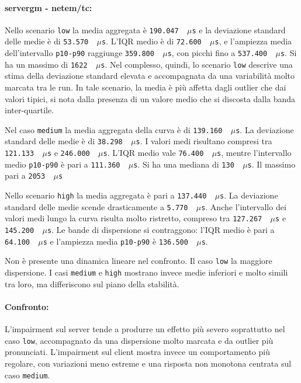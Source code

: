 \paragraph*{servergm - netem/tc:}
Nello scenario \texttt{low} la media aggregata è \texttt{190.047 \,$\mu$s} e la deviazione
standard delle medie è di \texttt{53.570 \,$\mu$s}. L'IQR medio è di \texttt{72.600
\,$\mu$s}, e l'ampiezza media dell'intervallo \texttt{p10-p90} raggiunge \texttt{359.800
\,$\mu$s}, con picchi fino a \texttt{537.400 \,$\mu$s}. Si ha un massimo di
\texttt{1622 \,$\mu$s}. Nel complesso, quindi, lo scenario \texttt{low} descrive una
stima della deviazione standard elevata e accompagnata da una variabilità molto marcata
tra le run. In tale scenario, la media è più affetta dagli outlier che dai valori tipici, 
si nota dalla presenza di un valore medio che si discosta dalla banda inter-quartile.

Nel caso \texttt{medium} la media aggregata della curva è di \texttt{139.160 \,$\mu$s}.
La deviazione standard delle medie è di \texttt{38.298 \,$\mu$s}. I valori medi
risultano compresi tra \texttt{121.133 \,$\mu$s} e \texttt{246.000 \,$\mu$s}. L'IQR
medio vale \texttt{76.400 \,$\mu$s}, mentre l'intervallo medio \texttt{p10-p90}
è pari a \texttt{111.360 \,$\mu$s}. Si ha una mediana di \texttt{130 \,$\mu$s}.
Il massimo pari a \texttt{2053 \,$\mu$s}

Nello scenario \texttt{high} la media aggregata è pari a \texttt{137.440 \,$\mu$s}.
La deviazione standard delle medie scende drasticamente a \texttt{5.770 \,$\mu$s}.
Anche l'intervallo dei valori medi lungo la curva risulta molto ristretto,
compreso tra \texttt{127.267 \,$\mu$s} e \texttt{145.200 \,$\mu$s}. Le bande di dispersione
si contraggono: l'IQR medio è pari a \texttt{64.100 \,$\mu$s} e l'ampiezza media \texttt{p10-p90}
è \texttt{136.500 \,$\mu$s}.

Non è presente una dinamica lineare nel confronto. Il caso \texttt{low} la maggiore
dispersione. I casi \texttt{medium} e \texttt{high} mostrano invece medie
inferiori e molto simili tra loro, ma differiscono sul piano della stabilità.

\paragraph*{Confronto:}
L'impairment sul server tende a produrre un effetto più severo soprattutto nel
caso \texttt{low}, accompagnato da una dispersione molto marcata e da outlier
più pronunciati. L'impairment sul client mostra invece un comportamento più regolare,
con variazioni meno estreme e una risposta non monotona centrata sul caso
\texttt{medium}.


